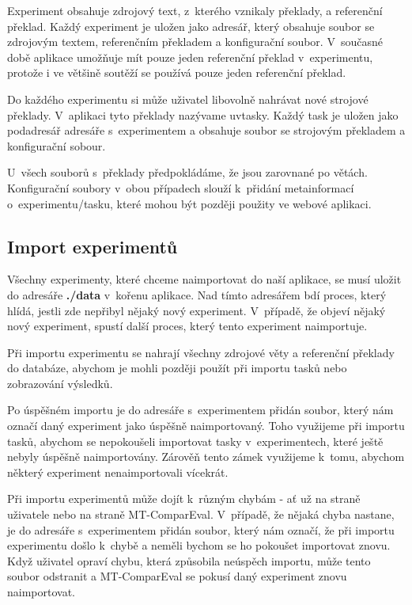 Experiment obsahuje zdrojový text, z~kterého vznikaly překlady, a referenční překlad.
Každý experiment je uložen jako adresář,
  který obsahuje soubor se zdrojovým textem, referenčním překladem
  a konfigurační soubor.
V~současné době aplikace umožňuje mít pouze jeden referenční překlad v~experimentu,
  protože i ve většině soutěží se používá pouze jeden referenční překlad.

Do každého experimentu si může uživatel libovolně nahrávat nové strojové překlady.
V~aplikaci tyto překlady nazývame uv{tasky}.
Každý task je uložen jako podadresář adresáře s~experimentem
  a obsahuje soubor se strojovým překladem
  a konfigurační sobour. 

U~všech souborů s~překlady předpokládáme, že jsou zarovnané po větách.
Konfigurační soubory v~obou případech slouží k~přidání metainformací o~experimentu/tasku,
  které mohou být později použity ve webové aplikaci.

\subsection{Import experimentů}
Všechny experimenty, které chceme naimportovat do naší aplikace,
  se musí uložit do adresáře \textbf{./data} v~kořenu aplikace.
Nad tímto adresářem bdí proces, který hlídá,
  jestli zde nepřibyl nějaký nový experiment.
V~případě, že objeví nějaký nový experiment,
  spustí další proces, který tento experiment naimportuje.

Při importu experimentu se nahrají všechny zdrojové věty
  a referenční překlady do databáze,
  abychom je mohli později použít při importu tasků
  nebo zobrazování výsledků.

Po úspěšném importu je do adresáře s~experimentem přidán soubor,
  který nám označí daný experiment jako úspěšně naimportovaný.
Toho využijeme při importu tasků,
  abychom se nepokoušeli importovat tasky v~experimentech,
  které ještě nebyly úspěšně naimportovány.
Zárověň tento zámek využijeme k~tomu,
  abychom některý experiment nenaimportovali vícekrát.

Při importu experimentů může dojít k~různým chybám -
  ať už na straně uživatele nebo na straně \mbox{MT-ComparEval}.
V~případě, že nějaká chyba nastane,
  je do adresáře s~experimentem přidán soubor,
  který nám označí,
  že při importu experimentu došlo k~chybě
  a neměli bychom se ho pokoušet importovat znovu.
Když uživatel opraví chybu,
  která způsobila neúspěch importu,
  může tento soubor odstranit
  a \mbox{MT-ComparEval} se pokusí daný experiment znovu naimportovat.


